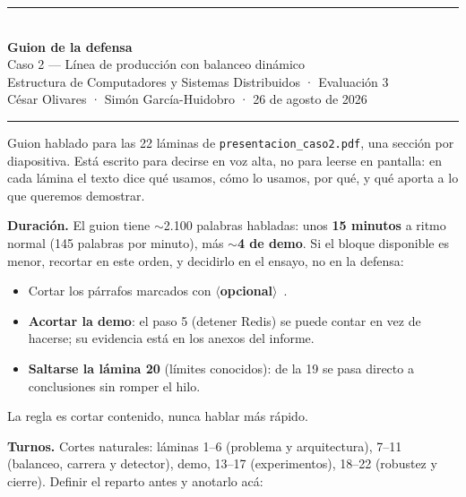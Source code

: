 \documentclass[11pt,a4paper]{article}
\newcommand{\opcional}{{\bfseries\color{ambar}$\langle$opcional$\rangle$}\ }
\begin{document}
\thispagestyle{empty}
\vspace*{1.2cm}
{\color{tealu}\rule{3cm}{2pt}}\\[14pt]
{\fontsize{24}{29}\selectfont\bfseries Guion de la defensa}\\[8pt]
{\large\color{tinta2}Caso 2 — Línea de producción con balanceo dinámico}\\[6pt]
{\color{tinta2}Estructura de Computadores y Sistemas Distribuidos · Evaluación 3}\\[4pt]
{\color{suave}César Olivares · Simón García-Huidobro · 26 de agosto de 2026}

\vspace{18pt}
{\color{suave}\rule{\linewidth}{0.4pt}}
\vspace{10pt}

\noindent Guion hablado para las 22 láminas de
\texttt{presentacion\_caso2.pdf}, una sección por diapositiva. Está escrito
para decirse en voz alta, no para leerse en pantalla: en cada lámina el texto
dice qué usamos, cómo lo usamos, por qué, y qué aporta a lo que queremos
demostrar.

\vspace{6pt}
\noindent\textbf{Duración.} El guion tiene $\sim$2.100 palabras habladas: unos
\textbf{15 minutos} a ritmo normal (145 palabras por minuto), más
\textbf{$\sim$4 de demo}. Si el bloque disponible es menor, recortar en este
orden, y decidirlo en el ensayo, no en la defensa:

\begin{itemize}[leftmargin=16pt, itemsep=2pt, topsep=4pt]
  \item Cortar los párrafos marcados con \opcional.
  \item \textbf{Acortar la demo}: el paso 5 (detener Redis) se puede contar en
        vez de hacerse; su evidencia está en los anexos del informe.
  \item \textbf{Saltarse la lámina 20} (límites conocidos): de la 19 se pasa
        directo a conclusiones sin romper el hilo.
\end{itemize}

\noindent La regla es cortar contenido, nunca hablar más rápido.

\vspace{6pt}
\noindent\textbf{Turnos.} Cortes naturales: láminas 1--6 (problema y
arquitectura), 7--11 (balanceo, carrera y detector), demo, 13--17
(experimentos), 18--22 (robustez y cierre). Definir el reparto antes y
anotarlo acá: \underline{\hspace{5cm}}
\end{document}
